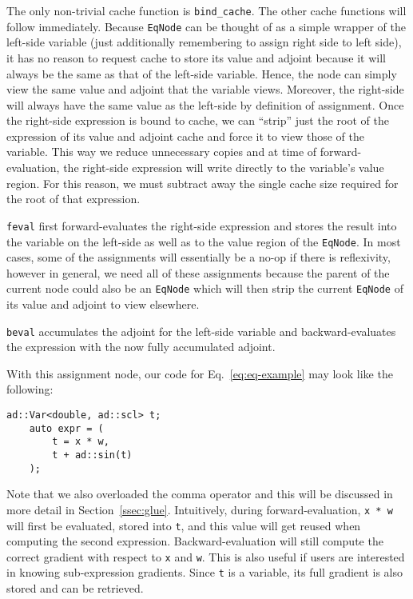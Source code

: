 The only non-trivial cache function is \verb|bind_cache|.
The other cache functions will follow immediately.
Because \verb|EqNode| can be thought of as a simple wrapper of 
the left-side variable (just additionally remembering to assign right side to left side),
it has no reason to request cache to store its value and adjoint
because it will always be the same as that of the left-side variable.
Hence, the node can simply view the same value and adjoint that the variable views.
Moreover, the right-side will always have the same value as the left-side
by definition of assignment.
Once the right-side expression is bound to cache, 
we can ``strip'' just the root of the expression
of its value and adjoint cache and force it to view those of the variable.
This way we reduce unnecessary copies and at time of forward-evaluation,
the right-side expression will write directly to the variable's value region.
For this reason, we must subtract away the 
single cache size required for the root of that expression.

\verb|feval| first forward-evaluates the right-side expression
and stores the result into the variable on the left-side
as well as to the value region of the \verb|EqNode|.
In most cases, some of the assignments will essentially be a no-op
if there is reflexivity, however in general, we need all of these assignments
because the parent of the current node could also be an \verb|EqNode|
which will then strip the current \verb|EqNode| of its value and adjoint
to view elsewhere.

\verb|beval| accumulates the adjoint for the left-side variable
and backward-evaluates the expression with the now fully accumulated adjoint.

With this assignment node, our code for Eq.~\ref{eq:eq-example}
may look like the following:
\begin{lstlisting}[style=customcpp]
    ad::Var<double, ad::scl> t;
    auto expr = (
        t = x * w,
        t + ad::sin(t)
    );
\end{lstlisting}
Note that we also overloaded the comma operator
and this will be discussed in more detail in Section~\ref{ssec:glue}.
Intuitively, during forward-evaluation, \verb|x * w| will first be evaluated,
stored into \verb|t|, and this value will get reused when computing the second expression.
Backward-evaluation will still compute the correct gradient with respect to \verb|x| and \verb|w|.
This is also useful if users are interested in knowing sub-expression gradients.
Since \verb|t| is a variable, its full gradient is also stored and can be retrieved.
